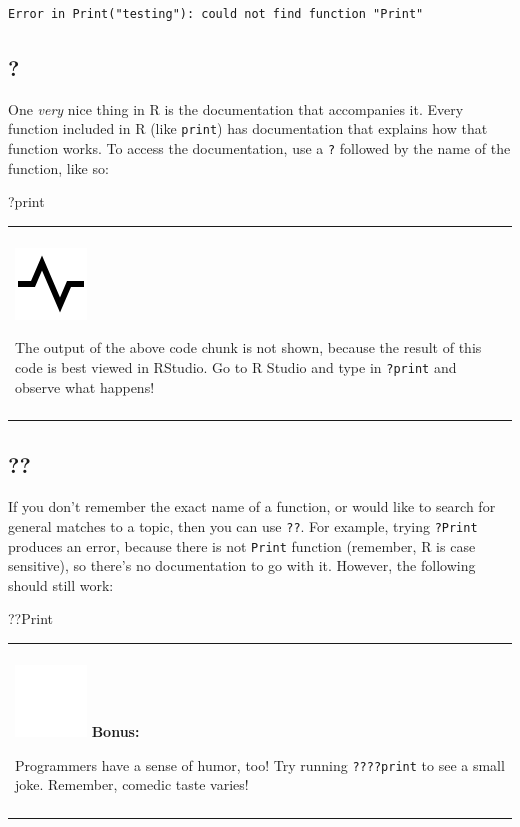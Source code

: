 \documentclass[
]{book}
\newenvironment{Shaded}{\begin{snugshade}}{\end{snugshade}}
\newcommand{\NormalTok}[1]{#1}
\newenvironment{bonus}
{
  \begin{center}
  \begin{tabular}{|>{\columncolor{bonus}\color{white}}p{0.9\textwidth}|}\hline\\
  \includegraphics[scale=0.1]{src/images/sun-fill-invert.png}
  \textbf{Bonus:}
}
{\\\\\hline
  \end{tabular}
  \end{center}
}
\newenvironment{progress}
{
  \begin{center}
  \begin{tabular}{|>{\columncolor{progress}}p{0.9\textwidth}|}
  \hline\\
  \includegraphics[scale=0.1]{src/images/pulse-line.png}
}
{\\\\\hline
  \end{tabular}
  \end{center}
}
\begin{document}
\begin{verbatim}
Error in Print("testing"): could not find function "Print"
\end{verbatim}

\hypertarget{section}{%
\subsection{?}\label{section}}

One \emph{very} nice thing in R is the documentation that accompanies it.
Every function included in R (like \texttt{print}) has documentation that explains how that function works.
To access the documentation, use a \texttt{?} followed by the name of the function, like so:

\begin{Shaded}
\begin{Highlighting}[]
\NormalTok{?print}
\end{Highlighting}
\end{Shaded}

\begin{progress}
The output of the above code chunk is not shown, because the result of
this code is best viewed in RStudio. Go to R Studio and type in
\texttt{?print} and observe what happens!
\end{progress}

\hypertarget{section-1}{%
\subsection{??}\label{section-1}}

If you don't remember the exact name of a function, or would like to search for general matches to a topic, then you can use \texttt{??}.
For example, trying \texttt{?Print} produces an error, because there is not \texttt{Print} function (remember, R is case sensitive), so there's no documentation to go with it.
However, the following should still work:

\begin{Shaded}
\begin{Highlighting}[]
\NormalTok{??Print}
\end{Highlighting}
\end{Shaded}

\begin{bonus}
Programmers have a sense of humor, too! Try running \texttt{????print}
to see a small joke. Remember, comedic taste varies!
\end{bonus}
\end{document}

